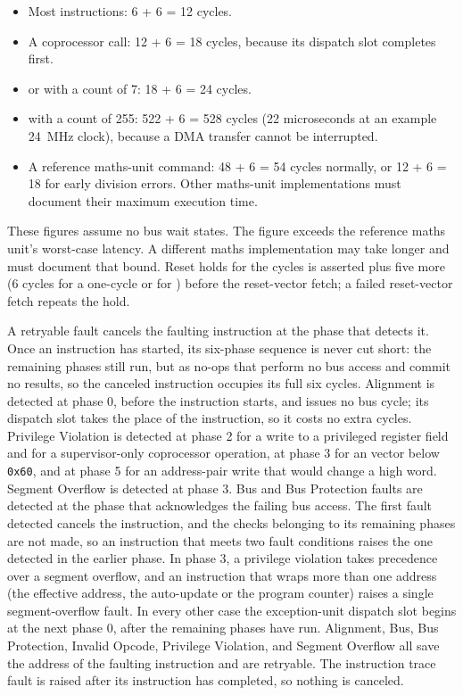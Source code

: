 \begin{itemize}
	\item Most instructions: 6 + 6 = 12 cycles.
	\item A coprocessor call: 12 + 6 = 18 cycles, because its dispatch slot completes first.
	\item {} or  with a count of 7: 18 + 6 = 24 cycles.
	\item {} with a count of 255: 522 + 6 = 528 cycles (22 microseconds at an example 24~MHz clock),
	      because a DMA transfer cannot be interrupted.
	\item A reference maths-unit command: 48 + 6 = 54 cycles normally, or 12 + 6 = 18 for early division errors. Other maths-unit
	      implementations must document their maximum execution time.
\end{itemize}

These figures assume no bus wait states. The  figure exceeds the reference maths unit's worst-case
latency. A different maths implementation may take longer and must document that bound. Reset holds 
for the cycles  is asserted plus five more (6 cycles for a one-cycle  or for
) before the reset-vector fetch; a failed reset-vector fetch repeats the hold.

A retryable fault cancels the faulting instruction at the phase that detects it. Once an instruction has started, its
six-phase sequence is never cut short: the remaining phases still run, but as no-ops that perform no bus access and
commit no results, so the canceled instruction occupies its full six cycles. Alignment is detected at phase 0, before
the instruction starts, and issues no bus cycle; its dispatch slot takes the place of the instruction, so it costs no
extra cycles. Privilege Violation is detected at phase 2 for a write to a privileged register field and for a
supervisor-only coprocessor operation, at phase 3 for an  vector below \texttt{0x60}, and at phase 5 for
an address-pair write that would change a high word. Segment Overflow is detected at phase 3. Bus and Bus Protection
faults are detected at the phase that acknowledges the failing bus access. The first fault detected cancels the
instruction, and the checks belonging to its remaining phases are not made, so an instruction that meets two fault
conditions raises the one detected in the earlier phase. In phase 3, a privilege violation takes precedence over a
segment overflow, and an instruction that wraps more than one address (the effective address, the auto-update or the
program counter) raises a single segment-overflow fault. In every other case the exception-unit dispatch slot begins at
the next phase 0, after the remaining phases have run. Alignment, Bus, Bus Protection, Invalid Opcode, Privilege
Violation, and Segment Overflow all save the address of the faulting instruction and are retryable. The instruction
trace fault is raised after its instruction has completed, so nothing is canceled.

